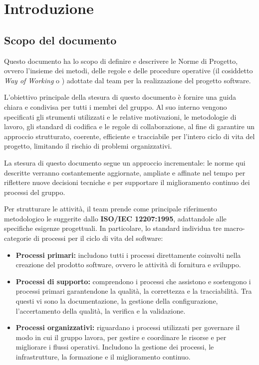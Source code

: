 \documentclass[documento]{gpt}
\begin{document}
	
	\section{Introduzione}
	\subsection{Scopo del documento}
	Questo documento ha lo scopo di definire e descrivere le Norme di Progetto, ovvero l'insieme dei metodi, delle regole e delle procedure operative (il cosiddetto \textit{Way of Working} o ) adottate dal team per la realizzazione del progetto software. 
	
	L'obiettivo principale della stesura di questo documento è fornire una guida chiara e condivisa per tutti i membri del gruppo. Al suo interno vengono specificati gli strumenti utilizzati e le relative motivazioni, le metodologie di lavoro, gli standard di codifica e le regole di collaborazione, al fine di garantire un approccio strutturato, coerente, efficiente e tracciabile per l'intero ciclo di vita del progetto, limitando il rischio di problemi organizzativi.
	
	La stesura di questo documento segue un approccio incrementale: le norme qui descritte verranno costantemente aggiornate, ampliate e affinate nel tempo per riflettere nuove decisioni tecniche e per supportare il miglioramento continuo dei processi del gruppo.
	
	Per strutturare le attività, il team prende come principale riferimento metodologico le \textit{} suggerite dallo  \textbf{ISO/IEC 12207:1995}, adattandole alle specifiche esigenze progettuali. In particolare, lo standard individua tre macro-categorie di processi per il ciclo di vita del software:
	\begin{itemize}
		\item \textbf{Processi primari:} includono tutti i processi direttamente coinvolti nella creazione del prodotto software, ovvero le attività di fornitura e sviluppo.
		\item \textbf{Processi di supporto:} comprendono i processi che assistono e sostengono i processi primari garantendone la qualità, la correttezza e la tracciabilità. Tra questi vi sono la documentazione, la gestione della configurazione, l'accertamento della qualità, la verifica e la validazione.
		\item \textbf{Processi organizzativi:} riguardano i processi utilizzati per governare il modo in cui il gruppo lavora, per gestire e coordinare le risorse e per migliorare i flussi operativi. Includono la gestione dei processi, le infrastrutture, la formazione e il miglioramento continuo.
	\end{itemize}
	
\end{document}
